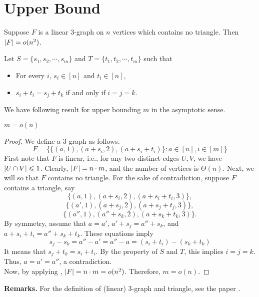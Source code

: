 \section{Upper Bound}
\begin{theorem} 
	\label{thm:RS}
	Suppose $ F $ is a linear 3-graph on $ n $ vertices which contains no triangle. Then $ \left\vert{F}\right\vert = o(n^2) $. 
\end{theorem}

\noindent Let $ S = \{s_1, s_2, \cdots, s_m\} $ and $ T =\{ t_1,t_2, \cdots, t_m\} $ such that 
\begin{itemize}
	\item For every $ i $, $ s_i \in [n] $ and $ t_i \in [n] $,
	\item $ s_i + t_i = s_j + t_k $  if and only if $ i = j = k $.
\end{itemize}
We have following result for upper bounding $ m $ in the asymptotic sense. 
\begin{theorem}
	$ m = o(n) $
\end{theorem}  

\begin{proof}
	We define a 3-graph as follows. 
	$$ F = \{ \{(a,1), (a+s_i, 2), (a + s_i + t_i)\} : a \in [n], i \in [m] \} $$
	First note that $ F $ is linear, i.e., for any two distinct edges $ U,V $, we have $ \left\vert{U \cap V}\right\vert \leqslant 1 $. Clearly, $ \left\vert{F}\right\vert = n \cdot m$, and the number of vertices is $ \Theta(n) $. Next, we will so that $ F $ contains no triangle. For the sake of contradiction, suppose $ F $ contains a triangle, say
	$$  \{ (a, 1), (a+s_i, 2), (a+ s_i + t_i, 3)\}, $$
	$$ \{ (a', 1), (a+s_j, 2), (a+ s_j + t_j, 3)\}, $$
	$$ \{ (a'', 1), (a''+s_k, 2), (a+ s_k + t_k, 3)\}. $$
	By symmetry, assume that $ a = a'$, $a' + s_j = a'' + s_k$, and $a + s_i+ t_i = a'' + s_k + t_k $.
	These equations imply
	$$ s_j - s_k = a'' - a' = a'' - a = (s_i + t_i) - (s_k + t_k)$$
	It means that $ s_j + t_k = s_i + t_i $. By the property of $ S $ and $ T $, this implies $  i = j = k $. Thus, $ a = a' = a'' $, a contradiction.\\
	Now, by applying , $ \left\vert{F}\right\vert = n \cdot m = o(n^2) $. Therefore, $ m = o(n) $. 
\end{proof}

\noindent \textbf{Remarks.} For the definition of (linear) 3-graph and triangle, see the paper \cite{frankl1987subsets}.

